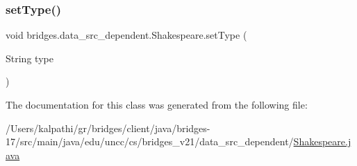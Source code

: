 \mbox{\label{classbridges_1_1data__src__dependent_1_1_shakespeare_afcee18014d5630a0a15701635005bea2}} 
\subsubsection{\texorpdfstring{set\+Type()}{setType()}}
{\footnotesize\ttfamily void bridges.\+data\+\_\+src\+\_\+dependent.\+Shakespeare.\+set\+Type (\begin{DoxyParamCaption}\item[{String}]{type }\end{DoxyParamCaption})}



The documentation for this class was generated from the following file\+:\begin{DoxyCompactItemize}
\item 
/\+Users/kalpathi/gr/bridges/client/java/bridges-\/17/src/main/java/edu/uncc/cs/bridges\+\_\+v21/data\+\_\+src\+\_\+dependent/\mbox{\hyperlink{_shakespeare_8java}{Shakespeare.\+java}}\end{DoxyCompactItemize}
